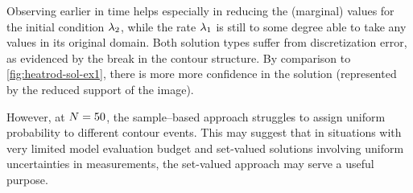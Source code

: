 Observing earlier in time helps especially in reducing the (marginal) values for the initial condition $\lambda_2$, while the rate $\lambda_1$ is still to some degree able to take any values in its original domain.
Both solution types suffer from discretization error, as evidenced by the break in the contour structure.
By comparison to \ref{fig:heatrod-sol-ex1}, there is more more confidence in the solution (represented by the reduced support of the image).

However, at $N=50$, the sample--based approach struggles to assign uniform probability to different contour events.
This may suggest that in situations with very limited model evaluation budget and set-valued solutions involving uniform uncertainties in measurements, the set-valued approach may serve a useful purpose.
